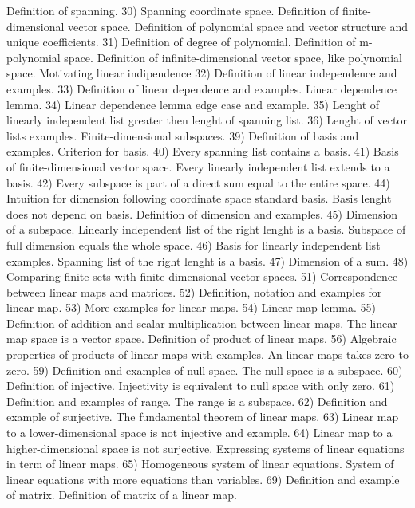 \begin{multicols}{3}
  Definition of spanning.
  30) Spanning coordinate space. Definition of finite-dimensional vector space.
  Definition of polynomial space and vector structure and unique coefficients.
  31) Definition of degree of polynomial. Definition of m-polynomial space.
  Definition of infinite-dimensional vector space, like polynomial space.
  Motivating linear indipendence
  32) Definition of linear independence and examples.
  33) Definition of linear dependence and examples. Linear dependence lemma.
  34) Linear dependence lemma edge case and example.
  35) Lenght of linearly independent list greater then lenght of spanning list.
  36) Lenght of vector lists examples. Finite-dimensional subspaces.
  39) Definition of basis and examples. Criterion for basis.
  40) Every spanning list contains a basis.
  41) Basis of finite-dimensional vector space. Every linearly independent list
  extends to a basis.
  42) Every subspace is part of a direct sum equal to the entire space.
  44) Intuition for dimension following coordinate space standard basis.
  Basis lenght does not depend on basis. Definition of dimension and examples.
  45) Dimension of a subspace. Linearly independent list of the right lenght is a
  basis. Subspace of full dimension equals the whole space.
  46) Basis for linearly independent list examples. Spanning list of the right
  lenght is a basis.
  47) Dimension of a sum.
  48) Comparing finite sets with finite-dimensional vector spaces.
  51) Correspondence between linear maps and matrices.
  52) Definition, notation and examples for linear map.
  53) More examples for linear maps.
  54) Linear map lemma.
  55) Definition of addition and scalar multiplication between linear maps.
  The linear map space is a vector space. Definition of product of linear maps.
  56) Algebraic properties of products of linear maps with examples. An linear
  maps takes zero to zero.
  59) Definition and examples of null space. The null space is a subspace.
  60) Definition of injective. Injectivity is equivalent to null space with
  only zero.
  61) Definition and examples of range. The range is a subspace.
  62) Definition and example of surjective. The fundamental theorem of linear
  maps.
  63) Linear map to a lower-dimensional space is not injective and example.
  64) Linear map to a higher-dimensional space is not surjective. Expressing
  systems of linear equations in term of linear maps.
  65) Homogeneous system of linear equations. System of linear equations with
  more equations than variables.
  69) Definition and example of matrix. Definition of matrix of a linear map.

\end{multicols}
